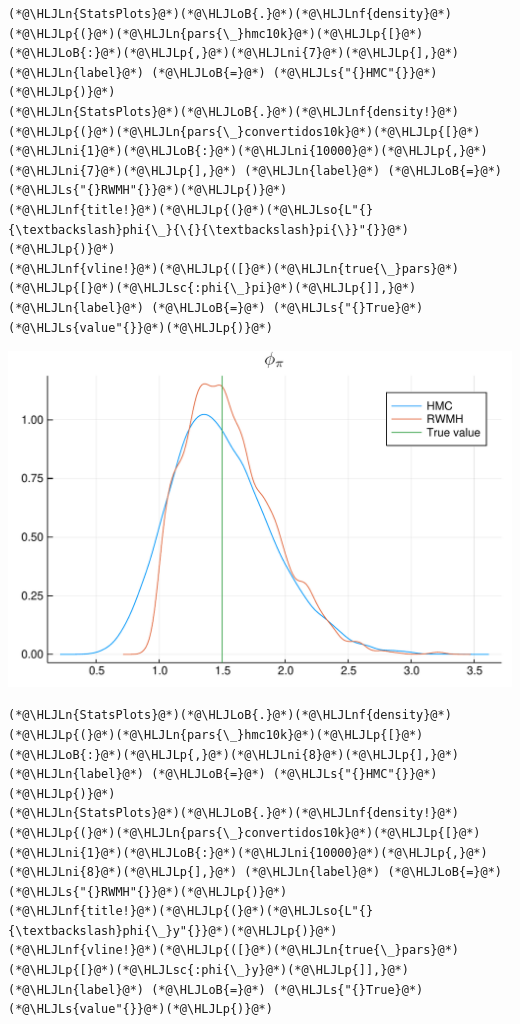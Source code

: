 \documentclass[12pt,a4paper]{article}
\newcommand{\HLJLn}[1]{#1}
\newcommand{\HLJLnf}[1]{\textcolor[RGB]{66,102,213}{#1}}
\newcommand{\HLJLs}[1]{\textcolor[RGB]{201,61,57}{#1}}
\newcommand{\HLJLsc}[1]{\textcolor[RGB]{201,61,57}{#1}}
\newcommand{\HLJLso}[1]{\textcolor[RGB]{201,61,57}{#1}}
\newcommand{\HLJLni}[1]{\textcolor[RGB]{59,151,46}{#1}}
\newcommand{\HLJLoB}[1]{\textcolor[RGB]{102,102,102}{\textbf{#1}}}
\newcommand{\HLJLp}[1]{#1}
\begin{document}
\begin{lstlisting}
(*@\HLJLn{StatsPlots}@*)(*@\HLJLoB{.}@*)(*@\HLJLnf{density}@*)(*@\HLJLp{(}@*)(*@\HLJLn{pars{\_}hmc10k}@*)(*@\HLJLp{[}@*)(*@\HLJLoB{:}@*)(*@\HLJLp{,}@*)(*@\HLJLni{7}@*)(*@\HLJLp{],}@*) (*@\HLJLn{label}@*) (*@\HLJLoB{=}@*) (*@\HLJLs{"{}HMC"{}}@*)(*@\HLJLp{)}@*)
(*@\HLJLn{StatsPlots}@*)(*@\HLJLoB{.}@*)(*@\HLJLnf{density!}@*)(*@\HLJLp{(}@*)(*@\HLJLn{pars{\_}convertidos10k}@*)(*@\HLJLp{[}@*)(*@\HLJLni{1}@*)(*@\HLJLoB{:}@*)(*@\HLJLni{10000}@*)(*@\HLJLp{,}@*)(*@\HLJLni{7}@*)(*@\HLJLp{],}@*) (*@\HLJLn{label}@*) (*@\HLJLoB{=}@*) (*@\HLJLs{"{}RWMH"{}}@*)(*@\HLJLp{)}@*)
(*@\HLJLnf{title!}@*)(*@\HLJLp{(}@*)(*@\HLJLso{L"{}{\textbackslash}phi{\_}{\{}{\textbackslash}pi{\}}"{}}@*)(*@\HLJLp{)}@*)
(*@\HLJLnf{vline!}@*)(*@\HLJLp{([}@*)(*@\HLJLn{true{\_}pars}@*)(*@\HLJLp{[}@*)(*@\HLJLsc{:phi{\_}pi}@*)(*@\HLJLp{]],}@*) (*@\HLJLn{label}@*) (*@\HLJLoB{=}@*) (*@\HLJLs{"{}True}@*) (*@\HLJLs{value"{}}@*)(*@\HLJLp{)}@*)
\end{lstlisting}

\includegraphics[width=\linewidth]{figures/dsge_and_julia_59_1.pdf}

\begin{lstlisting}
(*@\HLJLn{StatsPlots}@*)(*@\HLJLoB{.}@*)(*@\HLJLnf{density}@*)(*@\HLJLp{(}@*)(*@\HLJLn{pars{\_}hmc10k}@*)(*@\HLJLp{[}@*)(*@\HLJLoB{:}@*)(*@\HLJLp{,}@*)(*@\HLJLni{8}@*)(*@\HLJLp{],}@*) (*@\HLJLn{label}@*) (*@\HLJLoB{=}@*) (*@\HLJLs{"{}HMC"{}}@*)(*@\HLJLp{)}@*)
(*@\HLJLn{StatsPlots}@*)(*@\HLJLoB{.}@*)(*@\HLJLnf{density!}@*)(*@\HLJLp{(}@*)(*@\HLJLn{pars{\_}convertidos10k}@*)(*@\HLJLp{[}@*)(*@\HLJLni{1}@*)(*@\HLJLoB{:}@*)(*@\HLJLni{10000}@*)(*@\HLJLp{,}@*)(*@\HLJLni{8}@*)(*@\HLJLp{],}@*) (*@\HLJLn{label}@*) (*@\HLJLoB{=}@*) (*@\HLJLs{"{}RWMH"{}}@*)(*@\HLJLp{)}@*)
(*@\HLJLnf{title!}@*)(*@\HLJLp{(}@*)(*@\HLJLso{L"{}{\textbackslash}phi{\_}y"{}}@*)(*@\HLJLp{)}@*)
(*@\HLJLnf{vline!}@*)(*@\HLJLp{([}@*)(*@\HLJLn{true{\_}pars}@*)(*@\HLJLp{[}@*)(*@\HLJLsc{:phi{\_}y}@*)(*@\HLJLp{]],}@*) (*@\HLJLn{label}@*) (*@\HLJLoB{=}@*) (*@\HLJLs{"{}True}@*) (*@\HLJLs{value"{}}@*)(*@\HLJLp{)}@*)
\end{lstlisting}
\end{document}
